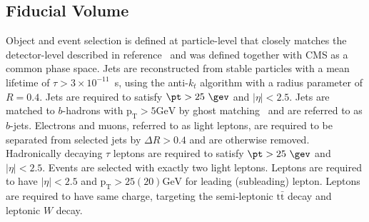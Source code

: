 
\subsection{Fiducial Volume}
\label{sec:ttw_fid}
Object and event selection is defined at particle-level that closely matches the detector-level described in reference~\cite{ATLAS-CONF-2019-045} and was defined together with CMS as a common phase space. 
Jets are reconstructed from stable particles with a mean lifetime of $\tau > 3\times 10^{-11}$~s, using the anti-$k_t$ algorithm with a radius parameter of $R=0.4$.
Jets are required to satisfy $\pt > 25~\gev$ and $|\eta| < 2.5$.
Jets are matched to $b$-hadrons with $\mathrm{p_{T}>5 GeV}$ by ghost matching~\cite{Cacciari:2008gn} and are referred to as $b$-jets. 
Electrons and muons, referred to as light leptons, are required to be separated from selected jets by $\Delta R>0.4$ and are otherwise removed. 
Hadronically decaying $\tau$ leptons are required to satisfy $\pt > 25~\gev$ and $|\eta| < 2.5$.
Events are selected with exactly two light leptons.
Leptons are required to have $|\eta|< 2.5$ and $\mathrm{p_{T}>25(20) GeV}$ for leading (subleading) lepton. 
Leptons are required to have same charge, targeting the semi-leptonic $\mathrm{t\bar{t}}$ decay and leptonic $W$ decay.

